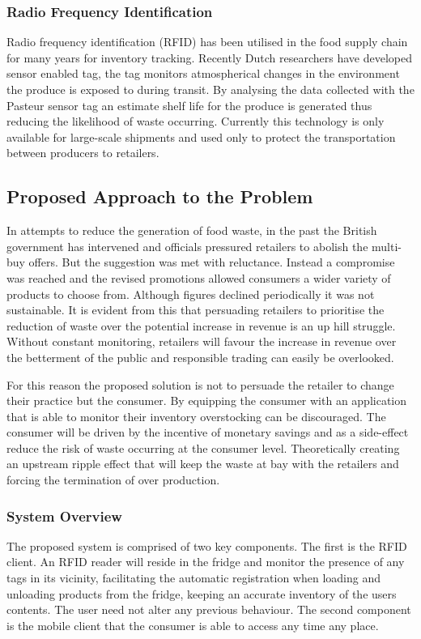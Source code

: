 \documentclass[a4paper, 11pt]{article}
\begin{document}
\subsubsection{Radio Frequency Identification} 
Radio frequency identification (RFID) has been utilised in the food supply chain for many years for inventory tracking. Recently Dutch researchers have developed sensor enabled tag, the tag monitors atmospherical changes in the environment the produce is exposed to during transit. By analysing the data collected with the Pasteur sensor tag an estimate shelf life for the produce is generated thus reducing the likelihood of waste occurring. Currently this technology is only available for large-scale shipments and used only to protect the transportation between producers to retailers. 

\subsection{Proposed Approach to the Problem}
In attempts to reduce the generation of food waste, in the past the British government has intervened and officials pressured retailers to abolish the multi-buy offers. But the suggestion was met with reluctance. Instead a compromise was reached and the revised promotions allowed consumers a wider variety of products to choose from. Although figures declined periodically it was not sustainable. It is evident from this that persuading retailers to prioritise the reduction of waste over the potential increase in revenue is an up hill struggle. Without constant monitoring, retailers will favour the increase in revenue over the betterment of the public and responsible trading can easily be overlooked. 

For this reason the proposed solution is not to persuade the retailer to change their practice but the consumer. By equipping the consumer with an application that is able to monitor their inventory overstocking can be discouraged. The consumer will be driven by the incentive of monetary savings and as a side-effect reduce the risk of waste occurring at the consumer level. Theoretically creating an upstream ripple effect that will keep the waste at bay with the retailers and forcing the termination of over production. 

\subsubsection{System Overview}
The proposed system is comprised of two key components. The first is the RFID client. An RFID reader will reside in the fridge and monitor the presence of any tags in its vicinity, facilitating the automatic registration when loading and unloading products from the fridge, keeping an accurate inventory of the users contents. The user need not alter any previous behaviour. The second component is the mobile client that the consumer is able to access any time any place.
\end{document}
